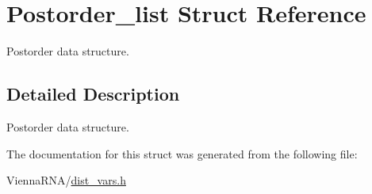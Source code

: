 \hypertarget{structPostorder__list}{}\section{Postorder\+\_\+list Struct Reference}
\label{structPostorder__list}


Postorder data structure.  




\subsection{Detailed Description}
Postorder data structure. 

The documentation for this struct was generated from the following file\+:\begin{DoxyCompactItemize}
\item 
Vienna\+R\+N\+A/\mbox{\hyperlink{dist__vars_8h}{dist\+\_\+vars.\+h}}\end{DoxyCompactItemize}
